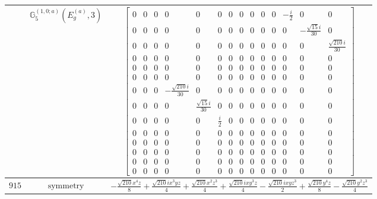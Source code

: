 \documentclass[fleqn,8pt,landscape]{jsarticle}
\begin{document}
\begin{longtable}{ccc}
$  $ & $ \mathbb{G}_{5}^{(1,0;a)}(E_{g}^{(a)},3) $ & $ \begin{bmatrix} 0 & 0 & 0 & 0 & 0 & 0 & 0 & 0 & 0 & 0 & 0 & - \frac{i}{2} & 0 & 0 \\ 0 & 0 & 0 & 0 & 0 & 0 & 0 & 0 & 0 & 0 & 0 & 0 & - \frac{\sqrt{15} i}{30} & 0 \\ 0 & 0 & 0 & 0 & 0 & 0 & 0 & 0 & 0 & 0 & 0 & 0 & 0 & \frac{\sqrt{210} i}{30} \\ 0 & 0 & 0 & 0 & 0 & 0 & 0 & 0 & 0 & 0 & 0 & 0 & 0 & 0 \\ 0 & 0 & 0 & 0 & 0 & 0 & 0 & 0 & 0 & 0 & 0 & 0 & 0 & 0 \\ 0 & 0 & 0 & 0 & 0 & 0 & 0 & 0 & 0 & 0 & 0 & 0 & 0 & 0 \\ 0 & 0 & 0 & - \frac{\sqrt{210} i}{30} & 0 & 0 & 0 & 0 & 0 & 0 & 0 & 0 & 0 & 0 \\ 0 & 0 & 0 & 0 & \frac{\sqrt{15} i}{30} & 0 & 0 & 0 & 0 & 0 & 0 & 0 & 0 & 0 \\ 0 & 0 & 0 & 0 & 0 & \frac{i}{2} & 0 & 0 & 0 & 0 & 0 & 0 & 0 & 0 \\ 0 & 0 & 0 & 0 & 0 & 0 & 0 & 0 & 0 & 0 & 0 & 0 & 0 & 0 \\ 0 & 0 & 0 & 0 & 0 & 0 & 0 & 0 & 0 & 0 & 0 & 0 & 0 & 0 \\ 0 & 0 & 0 & 0 & 0 & 0 & 0 & 0 & 0 & 0 & 0 & 0 & 0 & 0 \\ 0 & 0 & 0 & 0 & 0 & 0 & 0 & 0 & 0 & 0 & 0 & 0 & 0 & 0 \\ 0 & 0 & 0 & 0 & 0 & 0 & 0 & 0 & 0 & 0 & 0 & 0 & 0 & 0 \end{bmatrix} $ \\ \hline
$ 915 $ & $ \text{symmetry} $ & $ - \frac{\sqrt{210} x^{4} z}{8} + \frac{\sqrt{210} i x^{3} y z}{4} + \frac{\sqrt{210} x^{2} z^{3}}{4} + \frac{\sqrt{210} i x y^{3} z}{4} - \frac{\sqrt{210} i x y z^{3}}{2} + \frac{\sqrt{210} y^{4} z}{8} - \frac{\sqrt{210} y^{2} z^{3}}{4} $ \\

\end{longtable}
\end{document}
